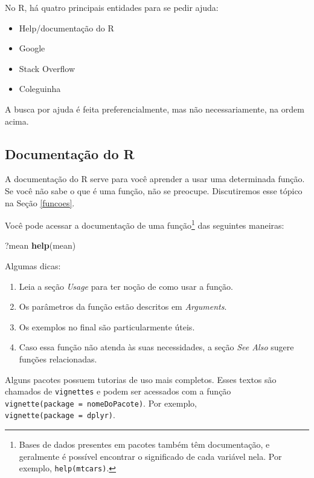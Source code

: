 \documentclass[]{book}
\newenvironment{Shaded}{\begin{snugshade}}{\end{snugshade}}
\newcommand{\KeywordTok}[1]{\textcolor[rgb]{0.13,0.29,0.53}{\textbf{#1}}}
\newcommand{\NormalTok}[1]{#1}
\providecommand{\tightlist}{%
  \setlength{\itemsep}{0pt}\setlength{\parskip}{0pt}}
\begin{document}
No R, há quatro principais entidades para se pedir ajuda:

\begin{itemize}
\tightlist
\item
  Help/documentação do R
\item
  Google
\item
  Stack Overflow
\item
  Coleguinha
\end{itemize}

A busca por ajuda é feita preferencialmente, mas não necessariamente, na ordem acima.

\hypertarget{documentauxe7uxe3o-do-r}{%
\subsection{Documentação do R}\label{documentauxe7uxe3o-do-r}}

A documentação do R serve para você aprender a usar uma determinada função. Se você não sabe o que é uma função, não se preocupe. Discutiremos esse tópico na Seção \ref{funcoes}.

Você pode acessar a documentação de uma função\footnote{Bases de dados presentes em pacotes também têm documentação, e geralmente é possível encontrar o significado de cada variável nela. Por exemplo, \texttt{help(mtcars)}.} das seguintes maneiras:

\begin{Shaded}
\begin{Highlighting}[]
\NormalTok{?mean}
\KeywordTok{help}\NormalTok{(mean)}
\end{Highlighting}
\end{Shaded}

Algumas dicas:

\begin{enumerate}
\def\labelenumi{\arabic{enumi}.}
\tightlist
\item
  Leia a seção \emph{Usage} para ter noção de como usar a função.
\item
  Os parâmetros da função estão descritos em \emph{Arguments}.
\item
  Os exemplos no final são particularmente úteis.
\item
  Caso essa função não atenda às suas necessidades, a seção \emph{See Also} sugere funções relacionadas.
\end{enumerate}

Alguns pacotes possuem tutorias de uso mais completos. Esses textos são chamados de \texttt{vignettes} e podem ser acessados com a função \texttt{vignette(package\ =\ \textquotesingle{}nomeDoPacote\textquotesingle{})}. Por exemplo, \texttt{vignette(package\ =\ \textquotesingle{}dplyr\textquotesingle{})}.
\end{document}

